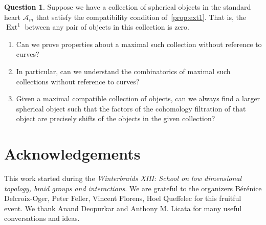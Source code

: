 \documentclass{amsart}
\theoremstyle{definition}
\newtheorem{question}[theorem]{Question}
\DeclareMathOperator{\Ext}{Ext} %
\begin{document}
\begin{question}
  Suppose we have a collection of spherical objects in the standard heart \(\mathcal{A}_m\) that satisfy the compatibility condition of~\cref{prop:ext1}.
  That is, the \(\Ext^1\) between any pair of objects in this collection is zero.
  \begin{enumerate}
  \item Can we prove properties about a maximal such collection without reference to curves?
  \item In particular, can we understand the combinatorics of maximal such collections without reference to curves?
  \item Given a maximal compatible collection of objects, can we always find a larger spherical object such that the factors of the cohomology filtration of that object are precisely shifts of the objects in the given collection?
  \end{enumerate}
\end{question}


\section*{Acknowledgements}

This work started during the \emph{Winterbraids XIII: School on low dimensional topology, braid groups and interactions}. We are grateful to the organizers Bérénice Delcroix-Oger, Peter Feller, Vincent Florens, Hoel Queffelec for this fruitful event.
We thank Anand Deopurkar and Anthony M. Licata for many useful conversations and ideas.


{}


\label{sec:biblio}
\end{document}
